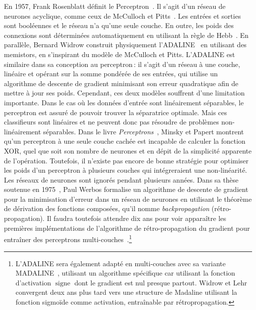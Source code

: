 En 1957, Frank Rosenblatt définit le Perceptron~\cite{rosenblatt_perceptron_1957}. Il s'agit d'un réseau de neurones acyclique, comme ceux de McCulloch et Pitts~\cite{mcculloch_logical_1943}. Les entrées et sorties sont booléennes et le réseau n'a qu'une seule couche. En outre, les poids des connexions sont déterminées automatiquement en utilisant la règle de Hebb~\cite{hebb_organization_1949}. En parallèle, Bernard Widrow construit physiquement l'ADALINE~\cite{widrow_adaptive_1960} en utilisant des memistors, en s'inspirant du modèle de McCulloch et Pitts. L'ADALINE est similaire dans sa conception au perceptron\,: il s'agit d'un réseau à une couche, linéaire et opérant sur la somme pondérée de ses entrées, qui utilise un algorithme de descente de gradient minimisant son erreur quadratique afin de mettre à jour ses poids. Cependant, ces deux modèles souffrent d'une limitation importante. Dans le cas où les données d'entrée sont linéairement séparables, le perceptron est assuré de pouvoir trouver la séparatrice optimale. Mais ces classifieurs sont linéaires et ne peuvent donc pas résoudre de problèmes non-linéairement séparables. Dans le livre \emph{Perceptrons}~\cite{minsky_perceptrons_1969}, Minsky et Papert montrent qu'un perceptron à une seule couche cachée est incapable de calculer la fonction XOR, quel que soit son nombre de neurones et en dépit de la simplicité apparente de l'opération. Toutefois, il n'existe pas encore de bonne stratégie pour optimiser les poids d'un perceptron à plusieurs couches qui intégreraient une non-linéarité. Les réseaux de neurones sont ignorés pendant plusieurs années. Dans sa thèse soutenue en 1975~\cite{werbos_beyond_1975}, Paul Werbos formalise un algorithme de descente de gradient pour la minimisation d'erreur dans un réseau de neurones en utilisant le théorème de dérivation des fonctions composées, qu'il nomme \emph{backpropagation} (rétro-propagation). Il faudra toutefois attendre dix ans pour voir apparaître les premières implémentations de l'algorithme de rétro-propagation du gradient pour entraîner des perceptrons multi-couches~\cite{rumelhart_learning_1986,lecun_learning_1986}.\footnote{L'ADALINE sera également adapté en multi-couches avec sa variante MADALINE~\cite{winter_madaline_1988}, utilisant un algorithme spécifique car utilisant la fonction d'activation $\operatorname{signe}$ dont le gradient est nul presque partout. Widrow et Lehr convergent deux ans plus tard vers une structure de Madaline utilisant la fonction sigmoïde comme activation, entraînable par rétropropagation.}

